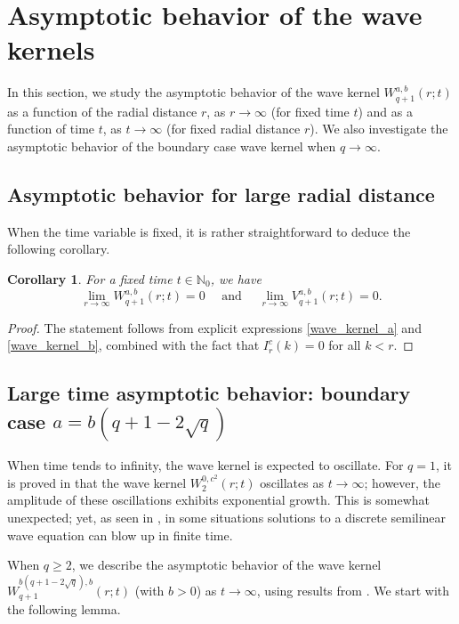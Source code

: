 \documentclass[12pt]{amsart}
\numberwithin{equation}{section}
\newtheorem{corollary}[theorem]{Corollary}
\theoremstyle{boldremark}
\begin{document}
\section{Asymptotic behavior of the wave kernels}\label{sec. asymptotics}

In this section, we study the asymptotic behavior of the wave kernel $W_{q+1}^{a,b}(r;t)$ as a function of the radial distance $r$, as $r\to\infty$ (for fixed time $t$) and as a function of time $t$, as $t\to\infty$ (for fixed radial distance $r$). We also investigate the asymptotic behavior of the boundary case wave kernel when $q\to\infty$.

\subsection{Asymptotic behavior for large radial distance}

When the time variable is fixed, it is rather straightforward to deduce the following corollary.

\begin{corollary}
    For a fixed time $t\in\mathbb{N}_0$, we have
    $$ \lim_{r\to\infty}W_{q+1}^{a,b}(r;t)=0\quad\,\, \text{and}\quad\,\,  \lim_{r\to\infty}V_{q+1}^{a,b}(r;t)=0.
    $$
\end{corollary}
\begin{proof}
The statement follows from explicit expressions \eqref{wave_kernel_a} and \eqref{wave_kernel_b},  combined with the fact that $I_r^c(k)=0$ for all $k<r$.
\end{proof}

\subsection{Large time asymptotic behavior: boundary case $a=b(q+1-2\sqrt{q})$}

When time tends to infinity, the wave kernel is expected to oscillate. For $q=1$, it is proved in \cite{BSS24} that the wave kernel $W_2^{0,c^2}(r;t)$ oscillates as $t\to\infty$; however, the amplitude of these oscillations exhibits exponential growth. This is somewhat unexpected; yet, as seen in \cite{Ch22}, in some situations solutions to a discrete semilinear wave equation can blow up in finite time.

When $q\geq 2$, we describe the asymptotic behavior of the wave kernel $W_{q+1}^{b(q+1-2\sqrt{q}),b}(r;t)$ (with $b>0$) as $t\to\infty$, using results from \cite{BSS24}. We start with the following lemma.
\end{document}
